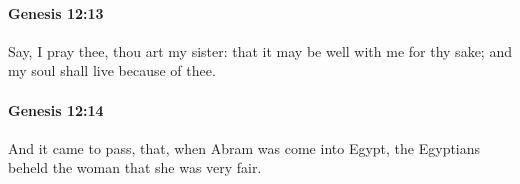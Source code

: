		\paragraph{Genesis 12:13} %
			\label{GENESIS-12-13}

			Say, I pray thee, thou art my sister: that it may be well with me for thy sake; and my soul shall live because of thee.


		\paragraph{Genesis 12:14} %
			\label{GENESIS-12-14}

			And it came to pass, that, when Abram was come into Egypt, the Egyptians beheld the woman that she was very fair.



